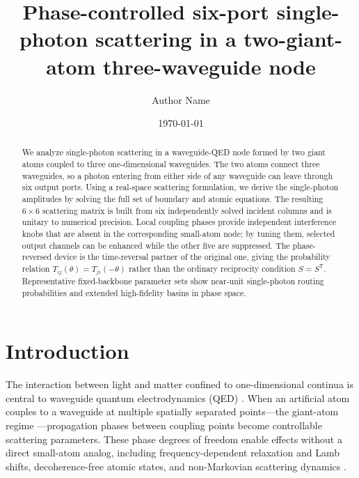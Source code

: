 \documentclass[aps,pra,reprint,superscriptaddress,nofootinbib,longbibliography,floatfix]{revtex4-2}
\begin{document}
\title{Phase-controlled six-port single-photon scattering in a two-giant-atom three-waveguide node}

\author{Author Name}

\date{\today}

\begin{abstract}
We analyze single-photon scattering in a waveguide-QED node formed by two giant atoms coupled to three one-dimensional waveguides.
The two atoms connect three waveguides, so a photon entering from either side of any waveguide can leave through six output ports.
Using a real-space scattering formulation, we derive the single-photon amplitudes by solving the full set of boundary and atomic equations.
The resulting $6\times6$ scattering matrix is built from six independently solved incident columns and is unitary to numerical precision.
Local coupling phases provide independent interference knobs that are absent in the corresponding small-atom node; by tuning them, selected output channels can be enhanced while the other five are suppressed.
The phase-reversed device is the time-reversal partner of the original one, giving the probability relation $T_{ij}(\theta)=T_{ji}(-\theta)$ rather than the ordinary reciprocity condition $S=S^{\mathsf T}$.
Representative fixed-backbone parameter sets show near-unit single-photon routing probabilities and extended high-fidelity basins in phase space.
\end{abstract}

\maketitle

\section{Introduction}

The interaction between light and matter confined to one-dimensional continua is central to waveguide quantum electrodynamics (QED) \cite{Roy2017Colloquium,Gu2017MicrowavePhotonics}.
When an artificial atom couples to a waveguide at multiple spatially separated points---the giant-atom regime \cite{Kockum2014Designing,Kockum2018GiantAtoms}---propagation phases between coupling points become controllable scattering parameters.
These phase degrees of freedom enable effects without a direct small-atom analog, including frequency-dependent relaxation and Lamb shifts, decoherence-free atomic states, and non-Markovian scattering dynamics \cite{Kockum2018GiantAtomsReview,Kannan2020GiantAtom}.
\end{document}
